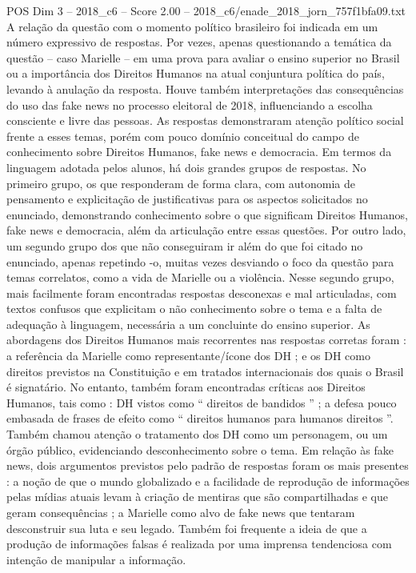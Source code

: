 \begin{textsample}{POS Dim 3 – 2018\_c6 – Score 2.00 – 2018\_c6/enade\_2018\_jorn\_757f1bfa09.txt}
A relação da questão com o momento político brasileiro foi indicada em um número expressivo de respostas.
Por vezes, apenas questionando a temática da questão – caso Marielle – em uma prova para avaliar o ensino superior no Brasil ou a importância dos Direitos Humanos na atual conjuntura política do país, levando à anulação da resposta.
Houve também interpretações das consequências do uso das fake news no processo eleitoral de 2018, influenciando a escolha consciente e livre das pessoas.
As respostas demonstraram atenção político social frente a esses temas, porém com pouco domínio conceitual do campo de conhecimento sobre Direitos Humanos, fake news e democracia.
Em termos da linguagem adotada pelos alunos, há dois grandes grupos de respostas.
No primeiro grupo, os que responderam de forma clara, com autonomia de pensamento e explicitação de justificativas para os aspectos solicitados no enunciado, demonstrando conhecimento sobre o que significam Direitos Humanos, fake news e democracia, além da articulação entre essas questões.
Por outro lado, um segundo grupo dos que não conseguiram ir além do que foi citado no enunciado, apenas repetindo -o, muitas vezes desviando o foco da questão para temas correlatos, como a vida de Marielle ou a violência.
Nesse segundo grupo, mais facilmente foram encontradas respostas desconexas e mal articuladas, com textos confusos que explicitam o não conhecimento sobre o tema e a falta de adequação à linguagem, necessária a um concluinte do ensino superior.
As abordagens dos Direitos Humanos mais recorrentes nas respostas corretas foram : a referência da Marielle como representante/ícone dos DH ; e os DH como direitos previstos na Constituição e em tratados internacionais dos quais o Brasil é signatário.
No entanto, também foram encontradas críticas aos Direitos Humanos, tais como : DH vistos como “ direitos de bandidos ” ; a defesa pouco embasada de frases de efeito como “ direitos humanos para humanos direitos ”.
Também chamou atenção o tratamento dos DH como um personagem, ou um órgão público, evidenciando desconhecimento sobre o tema.
Em relação às fake news, dois argumentos previstos pelo padrão de respostas foram os mais presentes : a noção de que o mundo globalizado e a facilidade de reprodução de informações pelas mídias atuais levam à criação de mentiras que são compartilhadas e que geram consequências ; a Marielle como alvo de fake news que tentaram desconstruir sua luta e seu legado.
Também foi frequente a ideia de que a produção de informações falsas é realizada por uma imprensa tendenciosa com intenção de manipular a informação.

\end{textsample}
